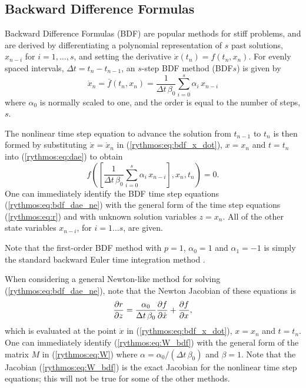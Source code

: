 
\subsection{Backward Difference Formulas}

Backward Difference Formulas (BDF) are popular methods for stiff problems,
and are derived by differentiating a polynomial representation of
$s$ past solutions, $x_{n-i}$ for $i=1,\ldots,s$, and setting the
derivative $\dot{x}(t_{n})=f(t_{n},x_{n})$. For evenly spaced intervals,
$\Delta t=t_{n}-t_{n-1}$, an $s$-step BDF method (BDF$s$) is given
by
\begin{equation}
\dot{x}_{n}=\bar{f}(t_{n},x_{n})=\frac{1}{\Delta t\,\beta_{0}}\sum_{i=0}^{s}\alpha_{i}\,x_{n-i}\label{rythmos:eq:bdf_x_dot}
\end{equation}
where $\alpha_{0}$ is normally scaled to one, and the order is equal
to the number of steps, $s$.

The nonlinear time step equation to advance the solution from $t_{n-1}$
to $t_{n}$ is then formed by substituting $\dot{x}=\dot{x}_{n}$
in (\ref{rythmos:eq:bdf_x_dot}), $x=x_{n}$ and $t=t_{n}$ into (\ref{rythmos:eq:dae})
to obtain 
\begin{equation}
f\left(\left[\frac{1}{\Delta t\,\beta_{0}}\sum_{i=0}^{s}\alpha_{i}\,x_{n-i}\right],x_{n},t_{n}\right)=0.\label{rythmos:eq:bdf_dae_ne}
\end{equation}
One can immediately identify the BDF time step equations (\ref{rythmos:eq:bdf_dae_ne})
with the general form of the time step equations (\ref{rythmos:eq:r})
and with unknown solution variables $z=x_{n}$. All of the other state
variables $x_{n-i}$, for $i=1\ldots s$, are given.

Note that the first-order BDF method with $p=1$, $\alpha_{0}=1$
and $\alpha_{1}=-1$ is simply the standard backward Euler time integration
method \cite{AscherPetzold}.

When considering a general Newton-like method for solving (\ref{rythmos:eq:bdf_dae_ne}),
note that the Newton Jacobian of these equations is 
\begin{equation}
\displaystyle{\frac{\partial r}{\partial z}}=\frac{\alpha_{0}}{\Delta t\,\beta_{0}}\displaystyle{\frac{\partial f}{\partial \dot{x}}}+\displaystyle{\frac{\partial f}{\partial x}},\label{rythmos:eq:W_bdf}
\end{equation}
which is evaluated at the point $\dot{x}$ in (\ref{rythmos:eq:bdf_x_dot}),
$x=x_{n}$ and $t=t_{n}$. One can immediately identify (\ref{rythmos:eq:W_bdf})
with the general form of the matrix $M$ in (\ref{rythmos:eq:W})
where $\alpha=\alpha_{0}/(\Delta t\,\beta_{0})$ and $\beta=1$. Note
that the Jacobian (\ref{rythmos:eq:W_bdf}) is the exact Jacobian
for the nonlinear time step equations; this will not be true for some
of the other methods.

